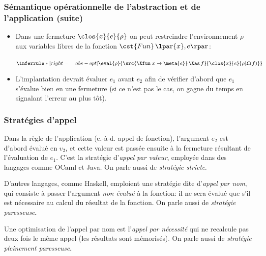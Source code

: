 %
\begin{frame}
\frametitle{Sémantique opérationnelle de l'abstraction et de
  l'application (suite)}

\remarques
\begin{itemize}

  \item Dans une fermeture $\clos{x}{e}{\rho}$ on peut restreindre
  l'environnement $\rho$ aux variables libres de la fonction
  $\cst{Fun} \, \lpar{x},e\rpar$:

  \centerline{$\inferrule*[right=\quad abs-opt]
    {\eval{\rho}
          {\src{\Xfun \; x \rightarrow \meta{e}} \, \Xas \, f}
          {\clos{x}{e}{\rho\arrowvert{\cal L} (f)}}}
    {}
  $}

  \item L'implantation devrait évaluer $e_1$ avant $e_2$ afin de
  vérifier d'abord que $e_1$ s'évalue bien en une fermeture (si ce
  n'est pas le cas, on gagne du temps en signalant l'erreur au plus
  tôt).

\end{itemize}

\end{frame}

%
\begin{frame}
\frametitle{Stratégies d'appel}

Dans la règle de l'application (c.-à-d. appel de fonction), l'argument
$e_2$ est d'abord évalué en $v_2$, et cette valeur est passée ensuite
à la fermeture résultant de l'évaluation de $e_1$. C'est la stratégie
d'\emph{appel par valeur}, employée dans des langages comme OCaml et
Java. On parle aussi de \emph{stratégie stricte}.

\bigskip

D'autres langages, comme Haskell, emploient une stratégie dite
d'\emph{appel par nom}, qui consiste à passer l'argument \emph{non
évalué} à la fonction: il ne sera évalué que s'il est nécessaire au
calcul du résultat de la fonction. On parle aussi de \emph{stratégie
paresseuse}.

\bigskip

Une optimisation de l'appel par nom est l'\emph{appel par nécessité}
qui ne recalcule pas deux fois le même appel (les résultats sont
mémorisés). On parle aussi de \emph{stratégie pleinement paresseuse}.

\end{frame}

